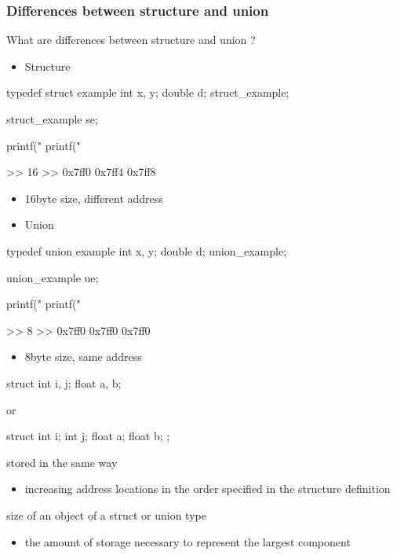 \documentclass[newPxFont,sthlmFooter,nooffset]{beamer}
\begin{document}
\begin{frame}
	\frametitle{Differences between structure and union}
What are differences between structure and union ? 
\begin{itemize}
	\item Structure
\end{itemize}
\begin{codedef}
typedef struct example{
	int x, y;
	double d;
}struct_example;

struct_example se;

printf("%
printf("%
\end{codedef}

>> 16
\newline>> 0x7ff0 0x7ff4 0x7ff8
\begin{itemize}
	\item 16byte size, different address
\end{itemize}

\framebreak



\begin{itemize}
	\item Union
\end{itemize}
\begin{codedef}
	typedef union example{
		int x, y;
		double d;
	}union_example;

	union_example ue;
	
	printf("%
	printf("%
\end{codedef}

>> 8
\newline>> 0x7ff0 0x7ff0 0x7ff0 
\begin{itemize}
	\item 8byte size, same address
\end{itemize}

\framebreak



\begin{codedef}
struct {
    int i, j; float a, b;
}  
\end{codedef}

or 
\begin{codedef}
struct {
    int i; int j; float a; float b;
};
\end{codedef}

stored in the same way
\begin{itemize}
\item increasing address locations in the order specified in the
  structure definition
\end{itemize}

size of an object of a struct or union type
\begin{itemize}
\item the amount of storage necessary to represent the largest
  component
\end{itemize}

\end{frame}
\end{document}

